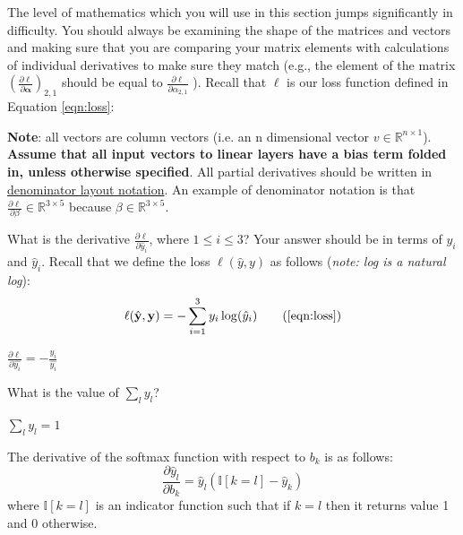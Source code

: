 \documentclass[11pt,addpoints,answers]{exam}
\newcommand{\Ib}{\mathbb{I}}
\newcommand{\yv}{\mathbf{y}}
\begin{document}
\begin{questions}
\begin{parts}
The level of mathematics which you will use in this section jumps significantly in difficulty. You should always be examining the shape of the matrices and vectors and making sure that you are comparing your matrix elements with calculations of individual derivatives to make sure they match (e.g., the element of the matrix $(\frac{\partial \ell}{\partial \boldsymbol{\alpha}})_{2,1}$ should be equal to $\frac{\partial \ell}{\partial \alpha_{2,1}}$  ). Recall that $\ell$ is our loss function defined in Equation \ref{eqn:loss}:

{\bf Note}: all vectors are column vectors (i.e. an n dimensional vector $v \in \mathbb{R}^{n \times 1}$). \textbf{Assume that all input vectors to linear layers have a bias term folded in, unless otherwise specified}. All partial derivatives should be written in \href{https://en.wikipedia.org/wiki/Matrix_calculus#Denominator-layout_notation}{denominator layout notation}. An example of denominator notation is that $\frac{\partial \ell}{\partial \beta} \in \mathbb{R}^{3 \times 5}$ because $\beta \in \mathbb{R}^{3 \times 5}$.

    
\begin{subparts}
    \subpart[1] What is the derivative $\frac{\partial \ell}{\partial \hat{y}_i}$, where $1 \leq i \leq 3$? Your answer should be in terms of $y_i$ and $\hat{y}_i$. Recall that we define the loss $\ell(\hat{y}, y)$ as follows (\textit{note: log is a natural log}):
    \begin{align}
        \ell(\hat{\yv},\yv) = - \sum_{i=1}^3 y_i \log(\hat{y}_i) \tag{\ref{eqn:loss}}
    \end{align}
    
    \begin{your_solution}[title=${\partial \ell}/{\partial \hat{y}_i}$, height=3cm, width=15cm]
    	$\frac{\partial \ell}{\partial \hat{y_i}} = -\frac{y_i}{\hat{y_i}}$
    \end{your_solution}
    
    \clearpage

    \subpart[1] What is the value of $\sum_l y_l$?

     \begin{your_solution}[title=${\sum_l y_l}$, height=2.5cm, width=15cm]
     	$\sum_l y_l = 1$
    \end{your_solution}

    \subpart[2] The derivative of the softmax function with respect to $b_k$ is as follows:
    \begin{equation}
    \label{eqn:dydbk}
    \frac{\partial \hat{y}_l}{\partial b_k} = \hat{y}_l(\Ib[k=l]-\hat{y}_k)
    \end{equation}
    where $\Ib[k=l]$ is an indicator function such that if $k=l$ then it returns value 1 and 0 otherwise.
    

\end{subparts}
\end{parts}
\end{questions}
\end{document}
